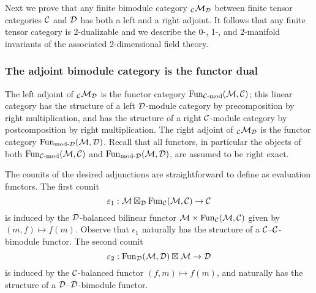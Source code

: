 \documentclass{amsart}
\begin{document}
Next we prove that any finite bimodule category ${}_\mathcal C \mathcal M_\mathcal D$ between finite tensor categories $\mathcal C$ and $\mathcal D$ has both a left and a right adjoint.  It follows that any finite tensor category is 2-dualizable and we describe the 0-, 1-, and 2-manifold invariants of the associated 2-dimensional field theory.

\subsubsection{The adjoint bimodule category is the functor dual} \label{sec:df-modules}

The left adjoint of ${}_\mathcal C \mathcal M_\mathcal D$ is the functor category $\Fun_{\mod{\cC}{}}(\cM,\cC)$; this linear category has the structure of a left $\mathcal D$-module category by precomposition by right multiplication, and has the structure of a right $\mathcal C$-module category by postcomposition by right multiplication.  The right adjoint of ${}_\mathcal C \mathcal M_\mathcal D$ is the functor category $\Fun_{\mod{}{\cD}}(\cM,\cD)$.  Recall that all functors, in particular the objects of both $\Fun_{\mod{\cC}{}}(\cM,\cC)$ and $\Fun_{\mod{}{\cD}}(\cM,\cD)$, are assumed to be right exact.

The counits of the desired adjunctions are straightforward to define as evaluation functors.  The first counit
\[
\varepsilon_1 : \mathcal M \boxtimes_\mathcal D \operatorname{Fun}_\mathcal C(\mathcal M,\mathcal C) \rightarrow \mathcal C
\]
is induced by the $\mathcal D$-balanced bilinear functor $\mathcal M \times \operatorname{Fun}_\mathcal C(\mathcal M,\mathcal C)$ given by $(m,f) \mapsto f(m)$.  Observe that $\epsilon_1$ naturally has the structure of a $\mathcal C$--$\mathcal C$-bimodule functor.  The second counit
\[
\varepsilon_2 : \operatorname{Fun}_\mathcal D(\mathcal M,\mathcal D) \boxtimes \mathcal M \rightarrow \mathcal D
\]
is induced by the $\mathcal C$-balanced functor $(f,m) \mapsto f(m)$, and naturally has the structure of a $\mathcal D$--$\mathcal D$-bimodule functor.
\end{document}
